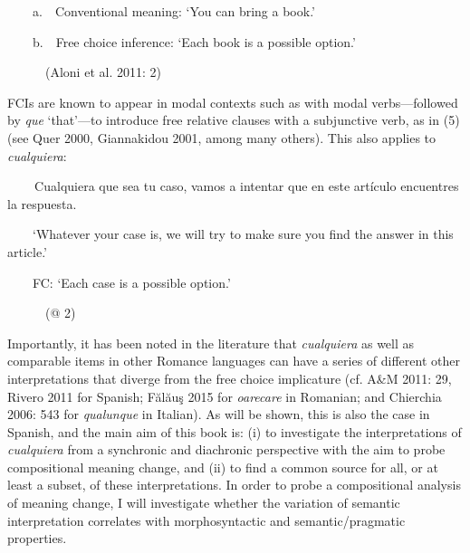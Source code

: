 \begin{styleStandard}
\ \ \ \ a.\ \ Conventional meaning: ‘You can bring a book.’
\end{styleStandard}

\begin{styleStandard}
\ \ \ \ b.\ \ Free choice inference: ‘Each book is a possible option.’
\end{styleStandard}

\begin{styleStandard}
\ \ \ \ \ \ (Aloni et al. 2011: 2)
\end{styleStandard}

\begin{styleStandard}
FCIs are known to appear in modal contexts such as with modal verbs—followed by \textit{que} ‘that’—to introduce free relative clauses with a subjunctive verb, as in (5) (see Quer 2000, Giannakidou 2001, among many others). This also applies to \textit{cualquiera}:
\end{styleStandard}

\begin{styleStandard}
\textbf{\ \ }\ \ Cualquiera que sea tu caso, vamos a intentar que en este artículo encuentres la respuesta.
\end{styleStandard}

\begin{styleStandard}
\ \ \ \ ‘Whatever your case is, we will try to make sure you find the answer in this article.’
\end{styleStandard}

\begin{styleStandard}
\ \ \ \ FC: ‘Each case is a possible option.’\ \ 
\end{styleStandard}

\begin{styleStandard}
\ \ \ \ \ \ (@ 2)
\end{styleStandard}

\begin{styleStandard}
Importantly, it has been noted in the literature that \textit{cualquiera} as well as comparable items in other Romance languages can have a series of different other interpretations that diverge from the free choice implicature (cf. A\&M 2011: 29, Rivero 2011 for Spanish; Fălăuş 2015 for \textit{oarecare }in Romanian; and Chierchia 2006: 543 for \textit{qualunque} in Italian). As will be shown, this is also the case in Spanish, and the main aim of this book is: (i) to investigate the interpretations of \textit{cualquiera} from a synchronic and diachronic perspective with the aim to probe compositional meaning change, and (ii) to find a common source for all, or at least a subset, of these interpretations. In order to probe a compositional analysis of meaning change, I will investigate whether the variation of semantic interpretation correlates with morphosyntactic and semantic/pragmatic properties.
\end{styleStandard}

